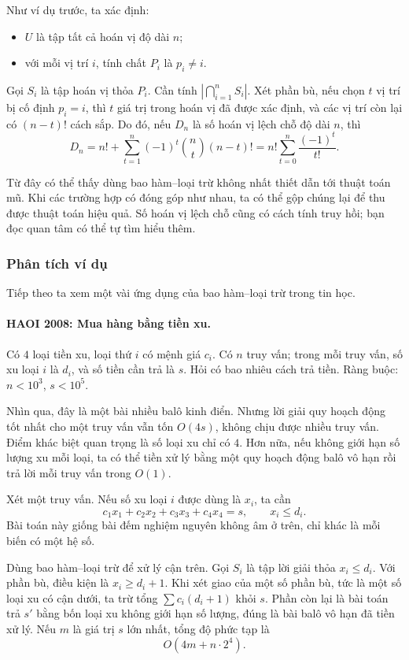 \documentclass[11pt]{article}
\begin{document}
Như ví dụ trước, ta xác định:
\begin{itemize}
  \item \(U\) là tập tất cả hoán vị độ dài \(n\);
  \item với mỗi vị trí \(i\), tính chất \(P_i\) là \(p_i\ne i\).
\end{itemize}
Gọi \(S_i\) là tập hoán vị thỏa \(P_i\). Cần tính
\(|\bigcap_{i=1}^n S_i|\). Xét phần bù, nếu chọn \(t\) vị trí bị cố định
\(p_i=i\), thì \(t\) giá trị trong hoán vị đã được xác định, và các vị trí còn
lại có \((n-t)!\) cách sắp. Do đó, nếu \(D_n\) là số hoán vị lệch chỗ độ dài
\(n\), thì
\[
  D_n=n!+\sum_{t=1}^n (-1)^t\binom nt(n-t)!
  = n!\sum_{t=0}^n\frac{(-1)^t}{t!}.
\]

Từ đây có thể thấy dùng bao hàm--loại trừ không nhất thiết dẫn tới thuật toán
mũ. Khi các trường hợp có đóng góp như nhau, ta có thể gộp chúng lại để thu
được thuật toán hiệu quả. Số hoán vị lệch chỗ cũng có cách tính truy hồi; bạn
đọc quan tâm có thể tự tìm hiểu thêm.

\subsubsection{Phân tích ví dụ}

Tiếp theo ta xem một vài ứng dụng của bao hàm--loại trừ trong tin học.

\paragraph{HAOI 2008: Mua hàng bằng tiền xu.}
Có \(4\) loại tiền xu, loại thứ \(i\) có mệnh giá \(c_i\). Có \(n\) truy vấn;
trong mỗi truy vấn, số xu loại \(i\) là \(d_i\), và số tiền cần trả là \(s\).
Hỏi có bao nhiêu cách trả tiền. Ràng buộc: \(n<10^3\), \(s<10^5\).

Nhìn qua, đây là một bài nhiều balô kinh điển. Nhưng lời giải quy hoạch động
tốt nhất cho một truy vấn vẫn tốn \(O(4s)\), không chịu được nhiều truy vấn.
Điểm khác biệt quan trọng là số loại xu chỉ có \(4\). Hơn nữa, nếu không giới
hạn số lượng xu mỗi loại, ta có thể tiền xử lý bằng một quy hoạch động balô vô
hạn rồi trả lời mỗi truy vấn trong \(O(1)\).

Xét một truy vấn. Nếu số xu loại \(i\) được dùng là \(x_i\), ta cần
\[
  c_1x_1+c_2x_2+c_3x_3+c_4x_4=s,\qquad x_i\le d_i.
\]
Bài toán này giống bài đếm nghiệm nguyên không âm ở trên, chỉ khác là mỗi biến
có một hệ số.

Dùng bao hàm--loại trừ để xử lý cận trên. Gọi \(S_i\) là tập lời giải thỏa
\(x_i\le d_i\). Với phần bù, điều kiện là \(x_i\ge d_i+1\). Khi xét giao của
một số phần bù, tức là một số loại xu có cận dưới, ta trừ tổng
\(\sum c_i(d_i+1)\) khỏi \(s\). Phần còn lại là bài toán trả \(s'\) bằng bốn
loại xu không giới hạn số lượng, đúng là bài balô vô hạn đã tiền xử lý. Nếu
\(m\) là giá trị \(s\) lớn nhất, tổng độ phức tạp là
\[
  O(4m+n\cdot 2^4).
\]
\end{document}
